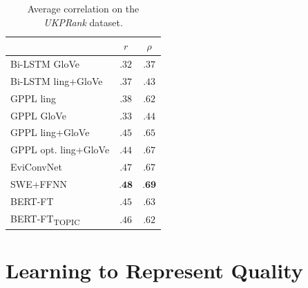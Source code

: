 \documentclass[letterpaper]{article}
\begin{document}
\begin{table}[htb]
\begin{center}
\begin{tabular}{ |l|c|c|  }
 \hline
 & $r$ & $\rho$ \\
 \hline
 Bi-LSTM GloVe & $.32$ & $.37$\\
 Bi-LSTM ling+GloVe & $.37$ & $.43$\\
 \hline
 GPPL ling & $.38$ & $.62$ \\
 GPPL GloVe & $.33$ & $.44$ \\
 GPPL ling+GloVe & $.45$ & $.65$ \\
 GPPL opt. ling+GloVe & $.44$ & $.67$\\
 \hline
 EviConvNet & $.47$ & $.67$ \\
 \hline
 SWE+FFNN & $\textbf{.48}$ & $\textbf{.69}$ \\
 \hline
 BERT-FT & $.45$ & $.63$ \\
 BERT-FT\textsubscript{TOPIC} & $.46$ & $.62$\\
 \hline
 \end{tabular}
 \end{center}
 \caption{Average correlation on the \textit{UKPRank} dataset.
 }
\label{table:resultsUKP}
\end{table}


\section{Learning to Represent Quality}
\label{analysisModels}
\end{document}
